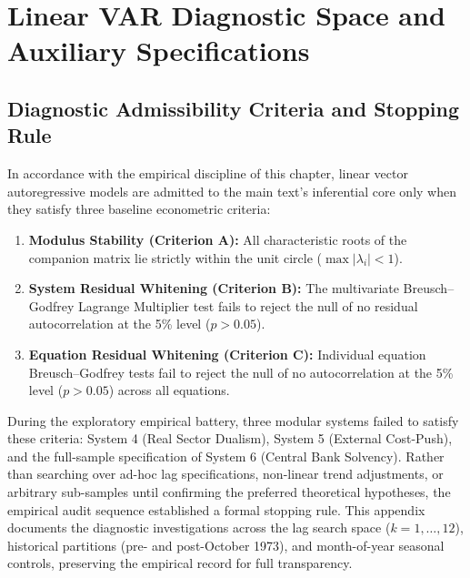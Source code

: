 \section{Linear VAR Diagnostic Space and Auxiliary Specifications}
\label{app:linear_var_diagnostics}

\subsection{Diagnostic Admissibility Criteria and Stopping Rule}
In accordance with the empirical discipline of this chapter, linear vector autoregressive models are admitted to the main text's inferential core only when they satisfy three baseline econometric criteria:
\begin{enumerate}
    \item \textbf{Modulus Stability (Criterion A):} All characteristic roots of the companion matrix lie strictly within the unit circle ($\max |\lambda_i| < 1$).
    \item \textbf{System Residual Whitening (Criterion B):} The multivariate Breusch--Godfrey Lagrange Multiplier test fails to reject the null of no residual autocorrelation at the 5\% level ($p > 0.05$).
    \item \textbf{Equation Residual Whitening (Criterion C):} Individual equation Breusch--Godfrey tests fail to reject the null of no autocorrelation at the 5\% level ($p > 0.05$) across all equations.
\end{enumerate}

During the exploratory empirical battery, three modular systems failed to satisfy these criteria: System 4 (Real Sector Dualism), System 5 (External Cost-Push), and the full-sample specification of System 6 (Central Bank Solvency). Rather than searching over ad-hoc lag specifications, non-linear trend adjustments, or arbitrary sub-samples until confirming the preferred theoretical hypotheses, the empirical audit sequence established a formal stopping rule. This appendix documents the diagnostic investigations across the lag search space ($k = 1, \dots, 12$), historical partitions (pre- and post-October 1973), and month-of-year seasonal controls, preserving the empirical record for full transparency.

